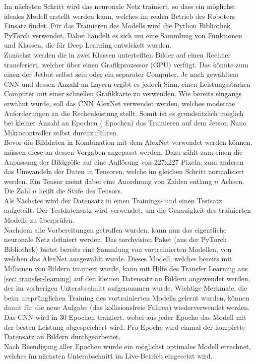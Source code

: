 Im nächsten Schritt wird das neuronale Netz trainiert, so dass ein möglichst ideales Modell erstellt werden kann, welches im realen Betrieb des Roboters Einsatz findet. Für das Trainieren des Modells wird die Python Bibliothek PyTorch verwendet. Dabei handelt es sich um eine Sammlung von Funktionen und Klassen, die für \glqq Deep Learning\grqq{} entwickelt wurden. \\
Zunächst werden die in zwei Klassen unterteilten Bilder auf einen Rechner transferiert, welcher über einen Grafikprozessor (GPU) verfügt. Das könnte zum einen der Jetbot selbst sein oder ein separater Computer. Je nach gewähltem CNN und dessen Anzahl an Layern ergibt es jedoch Sinn, einen Leistungsstarken Computer mit einer schnellen Grafikkarte zu verwenden. Wie bereits eingangs erwähnt wurde, soll das CNN AlexNet verwendet werden, welches moderate Anforderungen an die Rechenleistung stellt. Somit ist es grundsätzlich möglich bei kleiner Anzahl an Epochen ( Epochen) das Trainieren auf dem Jetson Nano Mikrocontroller selbst durchzuführen. \\
Bevor die Bilddaten in Kombination mit dem AlexNet verwendet werden können, müssen diese an dessen Vorgaben angepasst werden. Dazu zählt zum einen die Anpassung der Bildgröße auf eine Auflösung von 227x227 Pixeln, zum anderen das Umwandeln der Daten in Tensoren, welche im gleichen Schritt normalisiert werden. Ein Tensor meint dabei eine Anordnung von Zahlen entlang $n$ Achsen. Die Zahl $n$ heißt die Stufe des Tensors. \\
Als Nächstes wird der Datensatz in einen Trainings- und einen Testsatz aufgeteilt. Der Testdatensatz wird verwendet, um die Genauigkeit des trainierten Modells zu überprüfen.\\
Nachdem alle Vorbereitungen getroffen wurden, kann nun das eigentliche neuronale Netz definiert werden. Das \glqq torchvision\grqq{} Paket (aus der PyTorch Bibliothek) bietet bereits eine Sammlung von vortrainierten Modellen, von welchen das AlexNet ausgewählt wurde. Dieses Modell, welches bereits mit Millionen von Bildern trainiert wurde, kann mit Hilfe des Transfer Learning aus \autoref{sec: transfer-learning} auf den kleinen Datensatz an Bildern angewendet werden, der im vorherigen Unterabschnitt aufgenommen wurde. Wichtige Merkmale, die beim ursprünglichen Training des vortrainierten Modells gelernt wurden, können damit für die neue Aufgabe (das kollisionsfreie Fahren) wiederverwendet werden. \\
Das CNN wird in 30 Epochen trainiert, wobei aus jeder Epoche das Modell mit der besten Leistung abgespeichert wird. Pro Epoche wird einmal der komplette Datensatz an Bildern durchgearbeitet. \\
Nach Beendigung aller Epochen wurde ein möglichst optimales Modell errechnet, welches im nächsten Unterabschnitt im Live-Betrieb eingesetzt wird.

